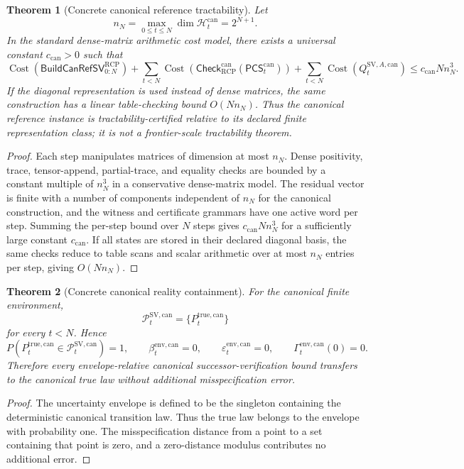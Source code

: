 \documentclass[11pt]{article}
\newtheorem{theorem}{Theorem}[section]
\newcommand{\Hcal}{\mathcal{H}}
\newcommand{\Pcal}{\mathcal{P}}
\newcommand{\1}{\mathbf{1}}
\newcommand{\RCP}{\mathrm{RCP}}
\providecommand{\true}{\mathrm{true}}
\providecommand{\Cost}{\operatorname{Cost}}
\begin{document}
\begin{theorem}[Concrete canonical reference tractability]
\label{thm:batch13ra_canonical_reference_tractability}
Let
\[
n_N=\max_{0\le t\le N}\dim\Hcal_t^{\mathrm{can}}=2^{N+1}.
\]
In the standard dense-matrix arithmetic cost model, there exists a universal constant \(c_{\mathrm{can}}>0\) such that
\[
\Cost(\mathsf{BuildCanRefSV}_{0:N}^{\RCP})
+
\sum_{t<N}\Cost(\mathsf{Check}_{\RCP}^{\mathrm{can}}(\mathsf{PCS}_t^{\mathrm{can}}))
+
\sum_{t<N}\Cost(Q_t^{\mathrm{SV},A,\mathrm{can}})
\le
c_{\mathrm{can}}N n_N^3.
\]
If the diagonal representation is used instead of dense matrices, the same construction has a linear table-checking bound \(O(N n_N)\).  Thus the canonical reference instance is tractability-certified relative to its declared finite representation class; it is not a frontier-scale tractability theorem.
\end{theorem}

\begin{proof}
Each step manipulates matrices of dimension at most \(n_N\).  Dense positivity, trace, tensor-append, partial-trace, and equality checks are bounded by a constant multiple of \(n_N^3\) in a conservative dense-matrix model.  The residual vector is finite with a number of components independent of \(n_N\) for the canonical construction, and the witness and certificate grammars have one active word per step.  Summing the per-step bound over \(N\) steps gives \(c_{\mathrm{can}}Nn_N^3\) for a sufficiently large constant \(c_{\mathrm{can}}\).  If all states are stored in their declared diagonal basis, the same checks reduce to table scans and scalar arithmetic over at most \(n_N\) entries per step, giving \(O(Nn_N)\).
\end{proof}

\begin{theorem}[Concrete canonical reality containment]
\label{thm:batch13ra_canonical_reality_containment}
For the canonical finite environment,
\[
\Pcal_t^{\mathrm{SV},\mathrm{can}}=\{P_t^{\true,\mathrm{can}}\}
\]
for every \(t<N\).  Hence
\[
P(P_t^{\true,\mathrm{can}}\in\Pcal_t^{\mathrm{SV},\mathrm{can}})=1,
\qquad
\beta_t^{\mathrm{env},\mathrm{can}}=0,
\qquad
\varepsilon_t^{\mathrm{env},\mathrm{can}}=0,
\qquad
\Gamma_t^{\mathrm{env},\mathrm{can}}(0)=0.
\]
Therefore every envelope-relative canonical successor-verification bound transfers to the canonical true law without additional misspecification error.
\end{theorem}

\begin{proof}
The uncertainty envelope is defined to be the singleton containing the deterministic canonical transition law.  Thus the true law belongs to the envelope with probability one.  The misspecification distance from a point to a set containing that point is zero, and a zero-distance modulus contributes no additional error.
\end{proof}
\end{document}
